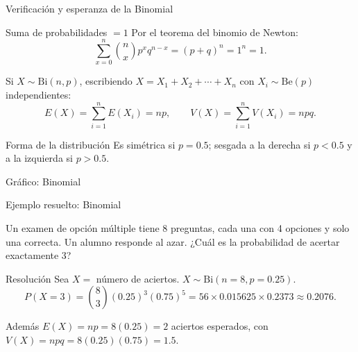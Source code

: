 \documentclass[aspectratio=169,11pt]{beamer}
\begin{document}
\begin{frame}{Verificación y esperanza de la Binomial}
\begin{block}{Suma de probabilidades $=1$}
Por el teorema del binomio de Newton:
$$\sum_{x=0}^n \binom{n}{x}p^x q^{n-x} = (p+q)^n = 1^n = 1.$$
\end{block}

\begin{theorem}
Si $X\sim \text{Bi}(n,p)$, escribiendo $X = X_1+X_2+\cdots+X_n$ con $X_i\sim \text{Be}(p)$ independientes:
$$E(X) = \sum_{i=1}^n E(X_i) = np, \qquad V(X) = \sum_{i=1}^n V(X_i) = npq.$$
\end{theorem}

\begin{alertblock}{Forma de la distribución}
Es simétrica si $p=0.5$; sesgada a la derecha si $p<0.5$ y a la izquierda si $p>0.5$.
\end{alertblock}
\end{frame}

\begin{frame}{Gráfico: Binomial}
\begin{center}
\end{center}
\end{frame}

\begin{frame}{Ejemplo resuelto: Binomial}
\begin{example}
Un examen de opción múltiple tiene 8 preguntas, cada una con 4 opciones y solo una correcta. Un alumno responde al azar. ¿Cuál es la probabilidad de acertar exactamente 3?
\end{example}

\begin{block}{Resolución}
Sea $X=$ número de aciertos. $X\sim\text{Bi}(n=8, p=0.25)$.
$$P(X=3) = \binom{8}{3}(0.25)^3(0.75)^5 = 56 \times 0.015625 \times 0.2373 \approx 0.2076.$$

Además $E(X) = np = 8(0.25) = 2$ aciertos esperados, con $V(X)=npq=8(0.25)(0.75)=1.5$.
\end{block}
\end{frame}
\end{document}

